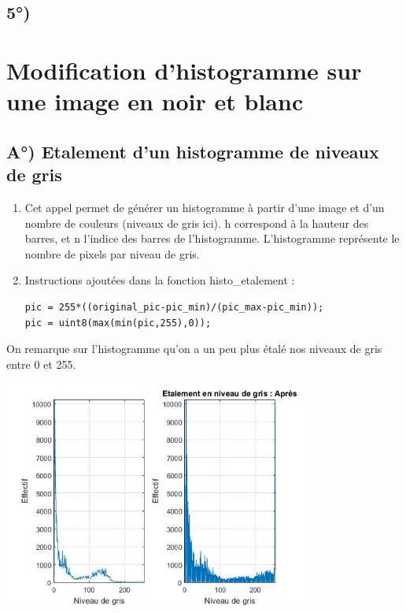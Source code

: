 \documentclass{article}
\begin{document}
\subsection*{5°) }

\section*{Modification d’histogramme sur une image en noir et blanc}
\subsection*{A°) Etalement d’un histogramme de niveaux de gris}
\begin{enumerate}[label=\arabic*$\degres$)]
	\item Cet appel permet de générer un histogramme à partir d’une image et d’un nombre de couleurs (niveaux de gris ici). h correspond à la hauteur des barres, et n l’indice des barres de l’histogramme. L’histogramme représente le nombre de pixels par niveau de gris.
	\item Instructions ajoutées dans la fonction histo\_etalement :
\begin{lstlisting}
pic = 255*((original_pic-pic_min)/(pic_max-pic_min));
pic = uint8(max(min(pic,255),0));
\end{lstlisting}

\end{enumerate}
On remarque sur l’histogramme qu’on a un peu plus étalé nos niveaux de gris entre 0 et 255.

\includegraphics[width=10cm]{Venise_histo_etalement.jpg}
\end{document}
